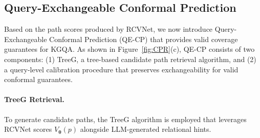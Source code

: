 \documentclass{article}
\theoremstyle{plain}
\theoremstyle{definition}
\theoremstyle{remark}
\begin{document}



\subsection{Query-Exchangeable Conformal Prediction }
\label{sec:method_QECP}

Based on the path scores produced by RCVNet, we now introduce 
Query-Exchangeable Conformal Prediction (QE-CP) that provides valid 
coverage guarantees for KGQA. As shown in Figure~\ref{fig:CPR}(c), QE-CP consists of two components: (1) TreeG, a tree-based candidate path retrieval algorithm, 
and (2) a query-level calibration procedure that preserves exchangeability 
for valid conformal guarantees.

\paragraph{TreeG Retrieval.} 
To generate candidate paths, the TreeG algorithm is employed that leverages RCVNet scores $V_{\bm\theta}(p)$ alongside LLM-generated relational hints.
\end{document}
